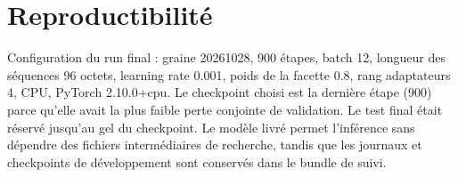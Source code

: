 \documentclass[11pt,a4paper]{article}
\begin{document}
\section{Reproductibilité}
Configuration du run final : graine 20261028, 900 étapes, batch 12, longueur des séquences 96 octets, learning rate 0.001, poids de la facette 0.8, rang adaptateurs 4, CPU, PyTorch 2.10.0+cpu. Le checkpoint choisi est la dernière étape (900) parce qu'elle avait la plus faible perte conjointe de validation. Le test final était réservé jusqu'au gel du checkpoint. Le modèle livré permet l'inférence sans dépendre des fichiers intermédiaires de recherche, tandis que les journaux et checkpoints de développement sont conservés dans le bundle de suivi.
\end{document}
